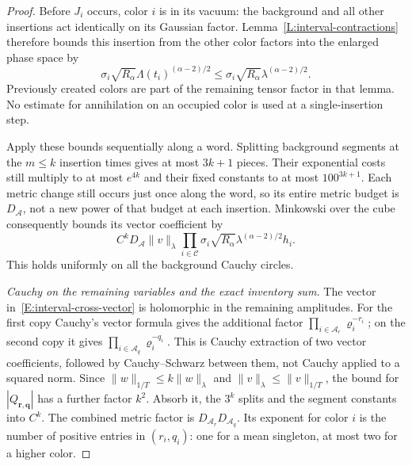 \documentclass[12pt]{article}
\numberwithin{equation}{section}
\theoremstyle{definition}
\begin{document}
\begin{proof}
  Before $J_i$ occurs, color $i$ is in its vacuum: the background and
  all other insertions act identically on its Gaussian factor.
  Lemma~\ref{L:interval-contractions} therefore bounds this insertion
  from the other color factors into the enlarged phase space by
  \[
    \sigma_i\sqrt{R_\alpha}\Lambda(t_i)^{(\alpha-2)/2}
    \le\sigma_i\sqrt{R_\alpha}\lambda^{(\alpha-2)/2}.
  \]
  Previously created colors are part of the remaining tensor factor in
  that lemma. No estimate for annihilation on an occupied color is used
  at a single-insertion step.

  Apply these bounds sequentially along a word. Splitting background
  segments at the $m\le k$ insertion times gives at most $3k+1$ pieces.
  Their exponential costs still multiply to at most $e^{4k}$ and their
  fixed constants to at most $100^{3k+1}$. Each metric change still occurs
  just once along the word, so its entire metric budget is
  $D_{\mathcal A}$, not a new power of that budget at each insertion.
  Minkowski over the cube consequently bounds its vector coefficient by
  \begin{equation}\label{E:interval-cross-vector}
    C^kD_{\mathcal A}\|v\|_\lambda
    \prod_{i\in\mathcal C}
    \sigma_i\sqrt{R_\alpha}\lambda^{(\alpha-2)/2}h_i .
  \end{equation}
  This holds uniformly on all the background Cauchy circles.

  \emph{Cauchy on the remaining variables and the exact inventory sum.}
  The vector in~\eqref{E:interval-cross-vector} is holomorphic in the
  remaining amplitudes. For the first copy Cauchy's vector formula gives
  the additional factor $\prod_{i\in\mathcal A_r}\varrho_i^{-r_i}$;
  on the second copy it gives $\prod_{i\in\mathcal A_q}\varrho_i^{-q_i}$.
  This is Cauchy extraction of two vector coefficients, followed by
  Cauchy--Schwarz between them, not Cauchy applied to a squared norm.
  Since $\|w\|_{1/T}\le k\|w\|_\lambda$ and
  $\|v\|_\lambda\le\|v\|_{1/T}$, the bound for
  $|Q_{\boldsymbol r,\boldsymbol q}|$ has a further factor $k^2$.
  Absorb it, the $3^k$ splits and the segment constants into $C^k$.
  The combined metric factor is $D_{\mathcal A_r}D_{\mathcal A_q}$.
  Its exponent for color $i$ is the number of positive entries in
  $(r_i,q_i)$: one for a mean singleton, at most two for a higher color.


\end{proof}
\end{document}
